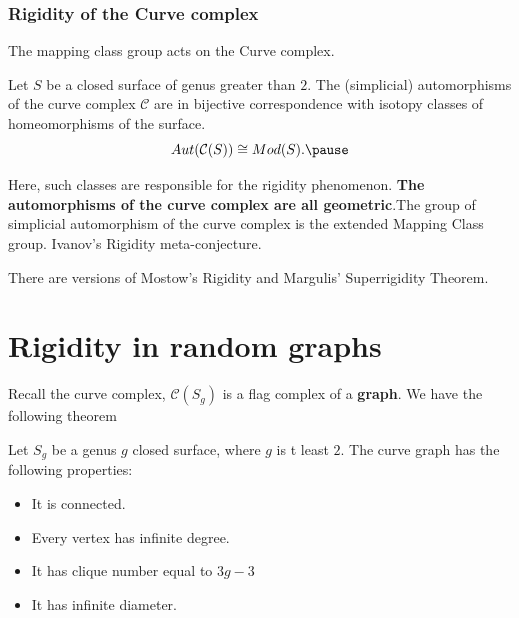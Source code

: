 \documentclass[handout]{beamer}
\theoremstyle{plain}
\begin{document}
\begin{frame} \frametitle{Rigidity  of  the  Curve  complex}
 The mapping class group acts on the Curve complex.

\begin{theorem}

Let  $S$  be  a  closed  surface  of  genus  greater than  $2$. The (simplicial) automorphisms  of the curve complex $\mathcal{C}$ are  in bijective correspondence  with  isotopy classes of homeomorphisms  of  the  surface.   \pause 
$$Aut(\mathcal{C}(S))\cong Mod(S).\pause $$
\end{theorem}

\end{frame}

\begin{frame}
Here, such classes  are  responsible  for  the  rigidity  phenomenon. \textbf{The  automorphisms  of  the  curve  complex  are  all geometric}.\pause  The  group  of simplicial   automorphism  of  the  curve  complex  is  the  extended  Mapping  Class group. \pause Ivanov's Rigidity  meta-conjecture.

There are versions  of Mostow's Rigidity and Margulis' Superrigidity Theorem. 
 

\end{frame}


\section{Rigidity in random graphs}
\begin{frame}

Recall  the  curve  complex, $\mathcal{C}(S_g)$ is a flag complex of a \textbf{graph}. We have the following theorem

 \begin{theorem}
Let  $S_g$ be  a  genus  $g$  closed  surface, where  $g$  is t  least $2$. 
The  curve  graph  has  the  following  properties: 
\begin{itemize}
\item  It  is  connected. 
\item Every  vertex  has  infinite degree. 
\item It  has  clique  number  equal  to $3g-3$
\item It  has infinite  diameter.  
\end{itemize}
\end{theorem}
\end{frame}
\end{document}
